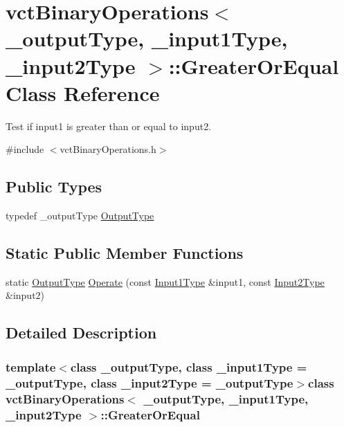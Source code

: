 \hypertarget{classvct_binary_operations_1_1_greater_or_equal}{}\section{vct\+Binary\+Operations$<$ \+\_\+output\+Type, \+\_\+input1\+Type, \+\_\+input2\+Type $>$\+:\+:Greater\+Or\+Equal Class Reference}
\label{classvct_binary_operations_1_1_greater_or_equal}


Test if input1 is greater than or equal to input2.  




{\ttfamily \#include $<$vct\+Binary\+Operations.\+h$>$}

\subsection*{Public Types}
\begin{DoxyCompactItemize}
\item 
typedef \+\_\+output\+Type \hyperlink{classvct_binary_operations_1_1_greater_or_equal_aeb46d29e2a560982db8181d297538b4b}{Output\+Type}
\end{DoxyCompactItemize}
\subsection*{Static Public Member Functions}
\begin{DoxyCompactItemize}
\item 
static \hyperlink{classvct_binary_operations_1_1_greater_or_equal_aeb46d29e2a560982db8181d297538b4b}{Output\+Type} \hyperlink{classvct_binary_operations_1_1_greater_or_equal_aa156cb77e1aca08bde00f5042edfb878}{Operate} (const \hyperlink{classvct_binary_operations_a5e56a66a012d6a28c539a08a0021c45e}{Input1\+Type} \&input1, const \hyperlink{classvct_binary_operations_a929119af557a04a16b4d854981e49e1b}{Input2\+Type} \&input2)
\end{DoxyCompactItemize}


\subsection{Detailed Description}
\subsubsection*{template$<$class \+\_\+output\+Type, class \+\_\+input1\+Type = \+\_\+output\+Type, class \+\_\+input2\+Type = \+\_\+output\+Type$>$class vct\+Binary\+Operations$<$ \+\_\+output\+Type, \+\_\+input1\+Type, \+\_\+input2\+Type $>$\+::\+Greater\+Or\+Equal}

